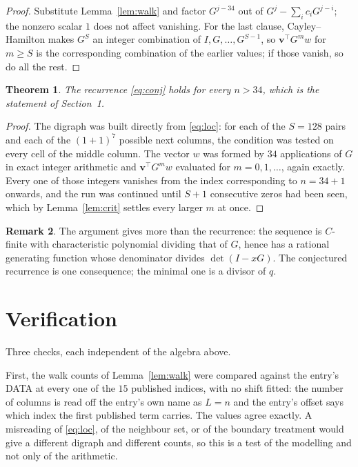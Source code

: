 \documentclass[11pt,a4paper]{article}
\theoremstyle{plain}
\newtheorem{theorem}{Theorem}
\theoremstyle{definition}
\newtheorem{remark}[theorem]{Remark}
\begin{document}
\begin{proof}
Substitute Lemma~\ref{lem:walk} and factor $G^{j-34}$ out of
$G^{j}-\sum_ic_iG^{j-i}$; the nonzero scalar $1$ does not affect
vanishing. For the last clause, Cayley--Hamilton makes $G^{S}$ an integer combination of
$I,G,\dots,G^{S-1}$, so $\mathbf{v}^{\!\top}G^{m}w$ for $m\ge S$ is the corresponding
combination of the earlier values; if those vanish, so do all the rest.
\end{proof}

\begin{theorem}
The recurrence \eqref{eq:conj} holds for every $n>34$, which is the statement of
Section~1.
\end{theorem}

\begin{proof}
The digraph was built directly from \eqref{eq:loc}: for each of the $S=128$ pairs and each
of the $(1+1)^{7}$ possible next columns, the condition was tested on every cell of
the middle column. The vector $w$ was formed by $34$ applications of $G$ in exact integer
arithmetic and $\mathbf{v}^{\!\top}G^{m}w$ evaluated for $m=0,1,\dots$, again exactly.
Every one of those integers vanishes from the index corresponding to $n=34+1$ onwards,
and the run was continued until $S+1$ consecutive zeros had been seen, which by
Lemma~\ref{lem:crit} settles every larger $m$ at once.
\end{proof}

\begin{remark}
The argument gives more than the recurrence: the sequence is $C$-finite with characteristic
polynomial dividing that of $G$, hence has a rational generating function whose denominator
divides $\det(I-xG)$. The conjectured recurrence is one consequence; the minimal one is a
divisor of $q$.
\end{remark}

\section{Verification}

Three checks, each independent of the algebra above.

First, the walk counts of Lemma~\ref{lem:walk} were compared against the entry's DATA at
every one of the $15$ published indices, with no shift fitted: the number of columns is
read off the entry's own name as $L=n$ and the entry's offset says which index the first
published term carries. The values agree exactly. A misreading of \eqref{eq:loc}, of the
neighbour set, or of the boundary treatment would give a different digraph and different
counts, so this is a test of the modelling and not only of the arithmetic.
\end{document}
